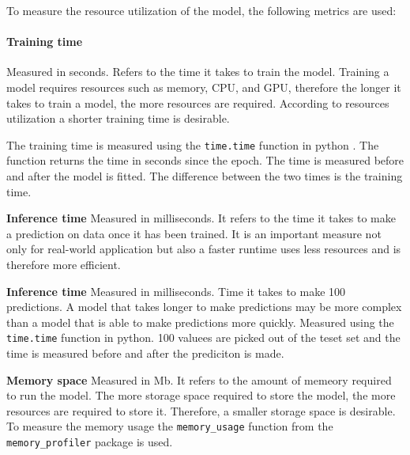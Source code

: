 To measure the resource utilization of the model, the following metrics are
used:

\paragraph*{Training time}
Measured in seconds. Refers to the time it takes to train the model.
Training a model requires resources such as memory, CPU, and GPU, therefore
the longer it takes
to train a model, the more resources are required. According to resources
utilization a shorter
training time is desirable.

The training time is measured using the \texttt{time.time} function in python
. The function
returns the time in seconds since the epoch. The time is measured before and
after the model is
fitted. The difference between the two times is the training time.

\textbf{Inference time}
Measured in milliseconds. It refers to the time it takes to make a prediction
on data once it has
been trained.
It is an important measure not only for real-world application but also a
faster runtime uses
less resources and is therefore more efficient.

\textbf{Inference time}
Measured in milliseconds. Time it takes to make 100 predictions.
A model that takes longer to make predictions may be more complex than a
model that is able to
make predictions more quickly.
Measured using the \texttt{time.time} function in python. 100 valuees are
picked out of the teset
set and the time is measured before and after the prediciton is made.

\textbf{Memory space}
Measured in Mb.
It refers to the amount of memeory required to run the model.
The more storage space required to store the model, the more resources are
required to store it.
Therefore, a smaller storage space is desirable.
To measure the memory usage the \texttt{memory\_usage} function from the
\texttt{memory\_profiler}
package is used.


